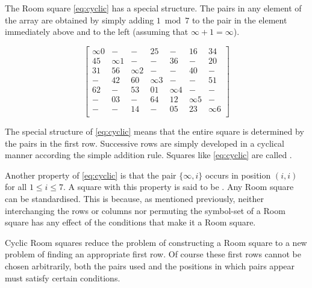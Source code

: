 The Room square \eqref{eq:cyclic} has a special structure.
The pairs in any element of the array are obtained by simply adding $1 \bmod{7}$ to the pair in the element immediately above and to the left (assuming that $\infty + 1 = \infty$).

\begin{equation}
  \begin{bmatrix}
    \infty 0 &     -    &     -    &     25     &     -    &     16     &    34    \\
      45     & \infty 1 &     -    &      -     &    36    &      -     &    20    \\
      31     &    56    & \infty 2 &      -     &     -    &     40     &     -    \\
       -     &    42    &    60    &  \infty 3  &     -    &      -     &    51    \\
      62     &     -    &    53    &     01     & \infty 4 &      -     &     -    \\
       -     &    03    &     -    &     64     &    12    &  \infty 5  &     -    \\
       -     &     -    &    14    &      -     &    05    &     23     & \infty 6 \\
  \end{bmatrix}
  \label{eq:cyclic}
\end{equation}

The special structure of \eqref{eq:cyclic} means that the entire square is determined by the pairs in the first row.
Successive rows are simply developed in a cyclical manner according the simple addition rule.
Squares like \eqref{eq:cyclic} are called .

Another property of \eqref{eq:cyclic} is that the pair $\{\infty,i\}$ occurs in position $(i,i)$ for all $1 \leq i \leq 7$.
A square with this property is said to be .
Any Room square can be standardised.
This is because, as mentioned previously, neither interchanging the rows or columns nor permuting the symbol-set of a Room square has any effect of the conditions that make it a Room square.

Cyclic Room squares reduce the problem of constructing a Room square to a new problem of finding an appropriate first row.
Of course these first rows cannot be chosen arbitrarily, both the pairs used and the positions in which pairs appear must satisfy certain conditions.

